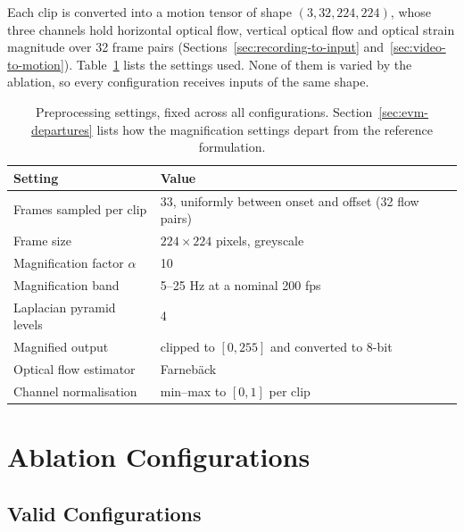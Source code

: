Each clip is converted into a motion tensor of shape $(3, 32, 224, 224)$, whose three channels hold horizontal optical flow, vertical optical flow and optical strain magnitude over 32 frame pairs (Sections~\ref{sec:recording-to-input} and~\ref{sec:video-to-motion}). Table~\ref{tab:preprocessing-settings} lists the settings used. None of them is varied by the ablation, so every configuration receives inputs of the same shape.

\begin{table}[htbp]
	\centering
	\small
	\begin{tabular}{@{}l l@{}}
		\hline
		\textbf{Setting} & \textbf{Value} \\
		\hline
		Frames sampled per clip        & 33, uniformly between onset and offset (32 flow pairs) \\
		Frame size                     & $224\times224$ pixels, greyscale \\
		Magnification factor $\alpha$  & 10 \\
		Magnification band             & 5--25 Hz at a nominal 200 fps \\
		Laplacian pyramid levels       & 4 \\
		Magnified output               & clipped to $[0,255]$ and converted to 8-bit \\
		Optical flow estimator         & Farneb\"ack~\cite{farneback2003} \\
		Channel normalisation          & min--max to $[0,1]$ per clip \\
		\hline
	\end{tabular}
	\caption[Preprocessing settings]{Preprocessing settings, fixed across all configurations. Section~\ref{sec:evm-departures} lists how the magnification settings depart from the reference formulation.}
	\label{tab:preprocessing-settings}
\end{table}


\section{Ablation Configurations}
\label{sec:ablation-matrix}

\subsection{Valid Configurations}
\label{sec:twelve-configs}
\label{sec:twelve-trained}
\label{sec:excluded-cells}
\label{sec:naming}

